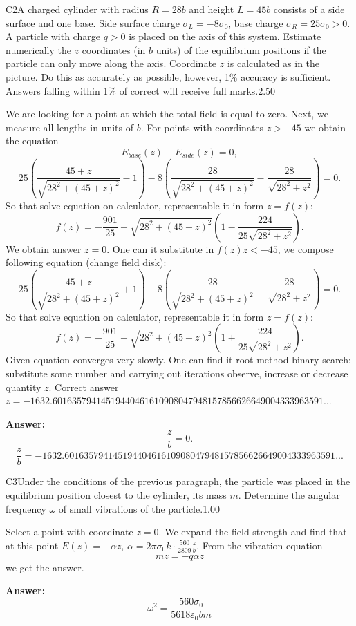 \documentclass[11pt,a4paper]{article}
\begin{document}
\begin{solcard}{C2}{A charged cylinder with radius $R=28b$ and height $L=45b$ consists of a side surface and one base. Side surface charge $\sigma_L=-8\sigma_0$, base charge $\sigma_R=25\sigma_0>0$. A particle with charge $q>0$ is placed on the axis of this system. Estimate numerically the $z$ coordinates (in $b$ units) of the equilibrium positions if the particle can only move along the axis.  Coordinate $z$ is calculated as in the picture. Do this as accurately as possible, however, 1\% accuracy is sufficient. Answers falling within 1\% of correct will receive full marks.}{2.50}

We are looking for a point at which the total field is equal to zero. Next, we measure all lengths in units of $b$. For points with coordinates $z>-45$ we obtain the equation $$E_{base}(z)+E_{side}(z) = 0,$$ $$25\left(\frac{45+z}{\sqrt{28^2+(45+z)^2}} -1 \right) - 8 \left(\frac{28}{\sqrt{28^2+(45+z)^2}} - \frac{28}{\sqrt{28^2+z^2}} \right) =0 .$$ So that solve equation on calculator, representable it in form $z=f(z)$: $$f(z) = - \frac{901}{25} + \sqrt{28^2+(45+z)^2} \left(1- \frac{224}{25 \sqrt{28^2+z^2}}  \right).$$ We obtain answer $z=0$. One can it substitute in $f(z)z<-45$, we compose following equation (change field disk): $$25\left(\frac{45+z}{\sqrt{28^2+(45+z)^2}} +1 \right) - 8 \left(\frac{28}{\sqrt{28^2+(45+z)^2}} - \frac{28}{\sqrt{28^2+z^2}} \right) =0 .$$ So that solve equation on calculator, representable it in form $z=f(z)$: $$f(z) = - \frac{901}{25} - \sqrt{28^2+(45+z)^2} \left(1+ \frac{224}{25 \sqrt{28^2+z^2}}  \right).$$ Given equation converges very slowly. One can find it root method binary search: substitute some number and carrying out iterations observe, increase or decrease quantity $z$. Correct answer $z = -1632.60163579414519440461610908047948157856626649004333963591...$

\par\smallskip\noindent\textbf{Answer:} $$\frac{z}{b}=0.$$ $$\frac{z}{b} = -1632.60163579414519440461610908047948157856626649004333963591...$$
\end{solcard}

\begin{solcard}{C3}{Under the conditions of the previous paragraph, the particle was placed in the equilibrium position closest to the cylinder, its mass $m$. Determine the angular frequency $\omega$ of small vibrations of the particle.}{1.00}

Select a point with coordinate $z=0$. We expand the field strength and find that at this point $E(z) = - \alpha z$, $\alpha=2\pi \sigma_0 k \cdot \frac{560}{2809} \frac{z}{b}$. From the vibration equation $$m \ddot{z} = - q \alpha z$$ we get the answer.

\par\smallskip\noindent\textbf{Answer:} $$\omega^2 = \frac{560 \sigma_0}{5618 \varepsilon_0 b m}$$
\end{solcard}
\end{document}
